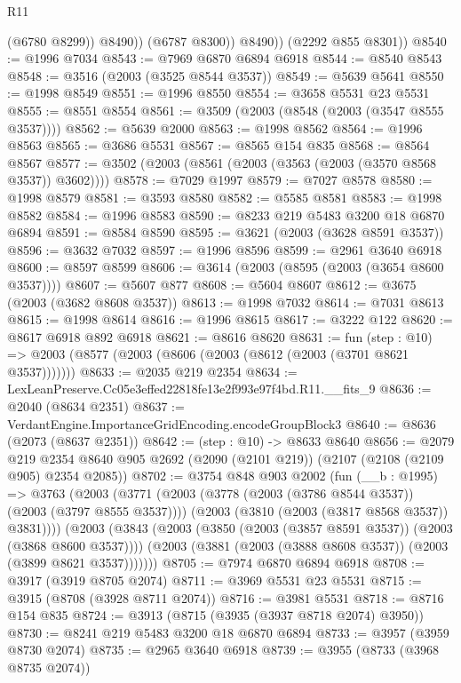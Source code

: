 \begin{lexlean}{R11}
\begin{coremodule}
                  (@6780 @8299))
                @8490))
            (@6787 @8300))
          @8490))
      (@2292 @855 @8301))
@8540 := @1996 @7034
@8543 := @7969 @6870 @6894 @6918
@8544 := @8540 @8543
@8548 := @3516 (@2003 (@3525 @8544 @3537))
@8549 := @5639 @5641
@8550 := @1998 @8549
@8551 := @1996 @8550
@8554 := @3658 @5531 @23 @5531
@8555 := @8551 @8554
@8561 := @3509 (@2003 (@8548 (@2003 (@3547 @8555 @3537))))
@8562 := @5639 @2000
@8563 := @1998 @8562
@8564 := @1996 @8563
@8565 := @3686 @5531
@8567 := @8565 @154 @835
@8568 := @8564 @8567
@8577 := @3502 (@2003 (@8561 (@2003 (@3563 (@2003 (@3570 @8568 @3537)) @3602))))
@8578 := @7029 @1997
@8579 := @7027 @8578
@8580 := @1998 @8579
@8581 := @3593 @8580
@8582 := @5585 @8581
@8583 := @1998 @8582
@8584 := @1996 @8583
@8590 := @8233 @219 @5483 @3200 @18 @6870 @6894
@8591 := @8584 @8590
@8595 := @3621 (@2003 (@3628 @8591 @3537))
@8596 := @3632 @7032
@8597 := @1996 @8596
@8599 := @2961 @3640 @6918
@8600 := @8597 @8599
@8606 := @3614 (@2003 (@8595 (@2003 (@3654 @8600 @3537))))
@8607 := @5607 @877
@8608 := @5604 @8607
@8612 := @3675 (@2003 (@3682 @8608 @3537))
@8613 := @1998 @7032
@8614 := @7031 @8613
@8615 := @1998 @8614
@8616 := @1996 @8615
@8617 := @3222 @122
@8620 := @8617 @6918 @892 @6918
@8621 := @8616 @8620
@8631 := fun (step : @10) =>
  @2003 (@8577 (@2003 (@8606 (@2003 (@8612 (@2003 (@3701 @8621 @3537)))))))
@8633 := @2035 @219 @2354
@8634 := LexLeanPreserve.Cc05e3effed22818fe13e2f993e97f4bd.R11.__fits_9
@8636 := @2040 (@8634 @2351)
@8637 := VerdantEngine.ImportanceGridEncoding.encodeGroupBlock3
@8640 := @8636 (@2073 (@8637 @2351))
@8642 := (step : @10) -> @8633 @8640
@8656 := @2079
    @219
    @2354
    @8640
    @905
    @2692
    (@2090 (@2101 @219))
    (@2107 (@2108 (@2109 @905) @2354 @2085))
@8702 := @3754
    @848
    @903
    @2002
    (fun (__b : @1995) =>
    @3763
      (@2003
        (@3771
          (@2003 (@3778 (@2003 (@3786 @8544 @3537)) (@2003 (@3797 @8555 @3537))))
          (@2003 (@3810 (@2003 (@3817 @8568 @3537)) @3831))))
      (@2003
        (@3843
          (@2003 (@3850 (@2003 (@3857 @8591 @3537)) (@2003 (@3868 @8600 @3537))))
          (@2003 (@3881 (@2003 (@3888 @8608 @3537)) (@2003 (@3899 @8621 @3537)))))))
@8705 := @7974 @6870 @6894 @6918
@8708 := @3917 (@3919 @8705 @2074)
@8711 := @3969 @5531 @23 @5531
@8715 := @3915 (@8708 (@3928 @8711 @2074))
@8716 := @3981 @5531
@8718 := @8716 @154 @835
@8724 := @3913 (@8715 (@3935 (@3937 @8718 @2074) @3950))
@8730 := @8241 @219 @5483 @3200 @18 @6870 @6894
@8733 := @3957 (@3959 @8730 @2074)
@8735 := @2965 @3640 @6918
@8739 := @3955 (@8733 (@3968 @8735 @2074))

\end{coremodule}
\end{lexlean}
